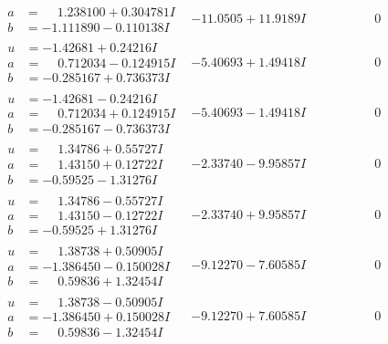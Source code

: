 \documentclass[1p]{elsarticle_modified}
\theoremstyle{definition}
\begin{document}
$$\begin{array}{c|c|c}
\begin{aligned}
a &= \phantom{-}1.238100 + 0.304781 I \\
b &= -1.111890 - 0.110138 I\end{aligned}
 & -11.0505 + 11.9189 I & \phantom{-0.000000 } 0 \\ \hline\begin{aligned}
u &= -1.42681 + 0.24216 I \\
a &= \phantom{-}0.712034 - 0.124915 I \\
b &= -0.285167 + 0.736373 I\end{aligned}
 & -5.40693 + 1.49418 I & \phantom{-0.000000 } 0 \\ \hline\begin{aligned}
u &= -1.42681 - 0.24216 I \\
a &= \phantom{-}0.712034 + 0.124915 I \\
b &= -0.285167 - 0.736373 I\end{aligned}
 & -5.40693 - 1.49418 I & \phantom{-0.000000 } 0 \\ \hline\begin{aligned}
u &= \phantom{-}1.34786 + 0.55727 I \\
a &= \phantom{-}1.43150 + 0.12722 I \\
b &= -0.59525 - 1.31276 I\end{aligned}
 & -2.33740 - 9.95857 I & \phantom{-0.000000 } 0 \\ \hline\begin{aligned}
u &= \phantom{-}1.34786 - 0.55727 I \\
a &= \phantom{-}1.43150 - 0.12722 I \\
b &= -0.59525 + 1.31276 I\end{aligned}
 & -2.33740 + 9.95857 I & \phantom{-0.000000 } 0 \\ \hline\begin{aligned}
u &= \phantom{-}1.38738 + 0.50905 I \\
a &= -1.386450 - 0.150028 I \\
b &= \phantom{-}0.59836 + 1.32454 I\end{aligned}
 & -9.12270 - 7.60585 I & \phantom{-0.000000 } 0 \\ \hline\begin{aligned}
u &= \phantom{-}1.38738 - 0.50905 I \\
a &= -1.386450 + 0.150028 I \\
b &= \phantom{-}0.59836 - 1.32454 I\end{aligned}
 & -9.12270 + 7.60585 I & \phantom{-0.000000 } 0 \\ \hline\begin{aligned}

\end{aligned}
\end{array}$$
\end{document}

